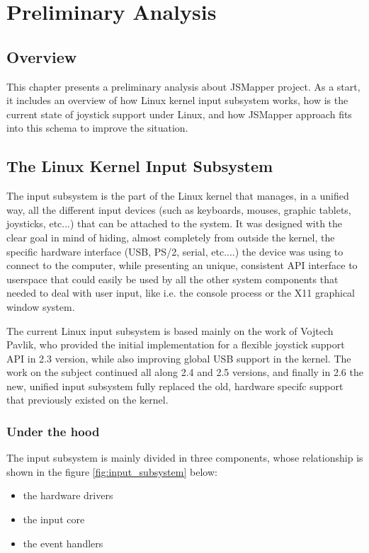 \chapter{Preliminary Analysis}\label{chap:preanalysis}
\section{Overview}
This chapter presents a preliminary analysis about JSMapper project. As a start, it includes an overview of how Linux kernel input subsystem works, how is the current state of joystick support under Linux, and how JSMapper approach fits into this schema to improve the situation.

\section{The Linux Kernel Input Subsystem}
The input subsystem is the part of the Linux kernel that manages, in a unified way, all the different input devices (such as keyboards, mouses, graphic tablets, joysticks, etc...) that can be attached to the system. It was designed with the clear goal in mind of hiding, almost completely from outside the kernel, the specific hardware interface (USB, PS/2, serial, etc....) the device was using to connect to the computer, while presenting an unique, consistent API interface to userspace that could easily be used by all the other system components that needed to deal with user input, like i.e. the console process or the X11 graphical window system.

The current Linux input subsystem is based mainly on the work of Vojtech Pavlik, who provided the initial implementation for a flexible joystick support API in 2.3 version, while also improving global USB support in the kernel. The work on the subject continued all along 2.4 and 2.5 versions, and finally in 2.6 the new, unified input subsystem fully replaced the old, hardware specifc support that previously existed on the kernel.

\subsection{Under the hood}
The input subsystem is mainly divided in three components, whose relationship is shown in the figure {\ref{fig:input_subsystem}} below:
\begin{itemize}
	\item the hardware drivers
	\item the input core
	\item the event handlers
\end{itemize}

